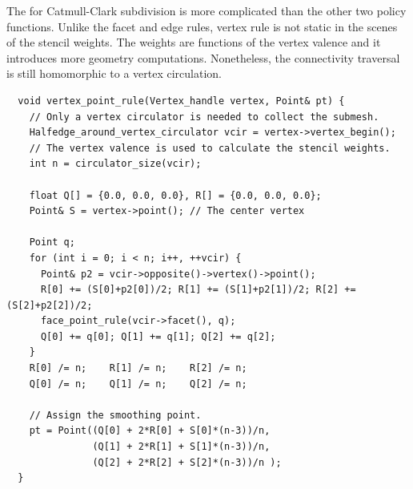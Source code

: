 The  for Catmull-Clark subdivision
is more complicated than the other two policy functions. Unlike
the facet and edge rules, vertex rule is not static in the scenes
of the stencil weights. The weights are functions of the vertex 
valence and it introduces more geometry computations. 
Nonetheless, the connectivity traversal is still homomorphic to
a vertex circulation.  
\begin{lstlisting}
  void vertex_point_rule(Vertex_handle vertex, Point& pt) {
    // Only a vertex circulator is needed to collect the submesh.
    Halfedge_around_vertex_circulator vcir = vertex->vertex_begin();
    // The vertex valence is used to calculate the stencil weights.
    int n = circulator_size(vcir);

    float Q[] = {0.0, 0.0, 0.0}, R[] = {0.0, 0.0, 0.0};
    Point& S = vertex->point(); // The center vertex
    
    Point q;
    for (int i = 0; i < n; i++, ++vcir) {
      Point& p2 = vcir->opposite()->vertex()->point();
      R[0] += (S[0]+p2[0])/2; R[1] += (S[1]+p2[1])/2; R[2] += (S[2]+p2[2])/2;
      face_point_rule(vcir->facet(), q);
      Q[0] += q[0]; Q[1] += q[1]; Q[2] += q[2];
    }
    R[0] /= n;    R[1] /= n;    R[2] /= n;
    Q[0] /= n;    Q[1] /= n;    Q[2] /= n;
      
    // Assign the smoothing point.
    pt = Point((Q[0] + 2*R[0] + S[0]*(n-3))/n,
               (Q[1] + 2*R[1] + S[1]*(n-3))/n,
               (Q[2] + 2*R[2] + S[2]*(n-3))/n );
  }
\end{lstlisting}
\vspace{0.5cm}

